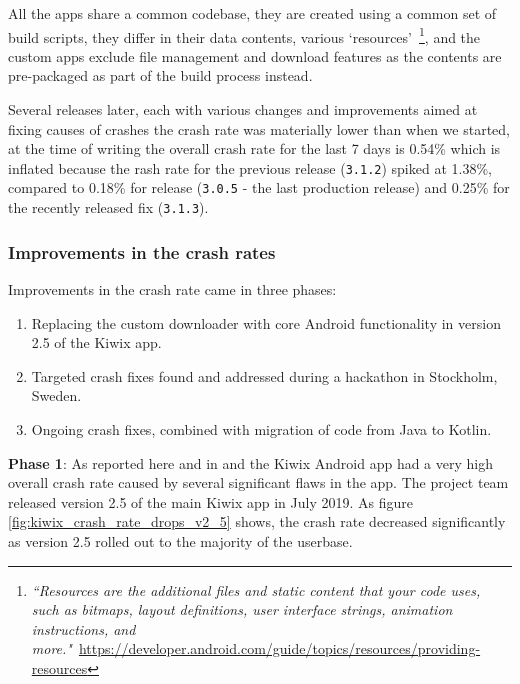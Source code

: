 All the apps share a common codebase, they are created using a common set of build scripts, they differ in their data contents, various `resources'~\footnote{\emph{``Resources are the additional files and static content that your code uses, such as bitmaps, layout definitions, user interface strings, animation instructions, and more."}~\url{https://developer.android.com/guide/topics/resources/providing-resources}}, and the custom apps exclude file management and download features as the contents are pre-packaged as part of the build process instead.

Several releases later, each with various changes and improvements aimed at fixing causes of crashes the crash rate was materially lower than when we started, at the time of writing the overall crash rate for the last 7 days is 0.54\% which is inflated because the rash rate for the previous release (\texttt{3.1.2}) spiked at 1.38\%, compared to 0.18\% for release (\texttt{3.0.5} -  the last production release) and 0.25\% for the recently released fix (\texttt{3.1.3}).



\subsubsection{Improvements in the crash rates}
Improvements in the crash rate came in three phases:
\begin{enumerate}
    \itemsep0em
    \item Replacing the custom downloader with core Android functionality in version 2.5 of the Kiwix app.
    \item Targeted crash fixes found and addressed during a hackathon in Stockholm, Sweden.
    \item Ongoing crash fixes, combined with migration of code from Java to Kotlin.
\end{enumerate}

\textbf{Phase 1}: As reported here and in \cite{harty_google_play_console_insightful_development_using_android_vitals_and_pre_launch_reports} and \cite{harty_better_android_apps_using_android_vitals} the Kiwix Android app had a very high overall crash rate caused by several significant flaws in the app. The project team released version 2.5 of the main Kiwix app in July 2019. As figure \ref{fig:kiwix_crash_rate_drops_v2_5} shows, the crash rate decreased significantly as version 2.5 rolled out to the majority of the userbase. %

